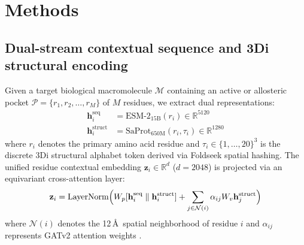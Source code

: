 \documentclass[11pt,a4paper]{article}
\begin{document}
\section*{Methods}

\subsection*{Dual-stream contextual sequence and 3Di structural encoding}
Given a target biological macromolecule $\mathcal{M}$ containing an active or allosteric pocket $\mathcal{P} = \{r_1, r_2, \dots, r_M\}$ of $M$ residues, we extract dual representations:
\begin{align}
\mathbf{h}_i^{\text{seq}} &= \text{ESM-2}_{15\text{B}}(r_i) \in \mathbb{R}^{5120} \\
\mathbf{h}_i^{\text{struct}} &= \text{SaProt}_{650\text{M}}(r_i, \tau_i) \in \mathbb{R}^{1280}
\end{align}
where $r_i$ denotes the primary amino acid residue and $\tau_i \in \{1, \dots, 20\}^3$ is the discrete 3Di structural alphabet token derived via Foldseek spatial hashing. The unified residue contextual embedding $\mathbf{z}_i \in \mathbb{R}^{d}$ ($d = 2048$) is projected via an equivariant cross-attention layer:
\begin{equation}
\mathbf{z}_i = \text{LayerNorm}\Bigl( W_p [\mathbf{h}_i^{\text{seq}} \parallel \mathbf{h}_i^{\text{struct}}] + \sum_{j \in \mathcal{N}(i)} \alpha_{ij} W_v \mathbf{h}_j^{\text{struct}} \Bigr)
\end{equation}
where $\mathcal{N}(i)$ denotes the 12\,\AA\ spatial neighborhood of residue $i$ and $\alpha_{ij}$ represents GATv2 attention weights \cite{brody2022attentive}.

\end{document}
